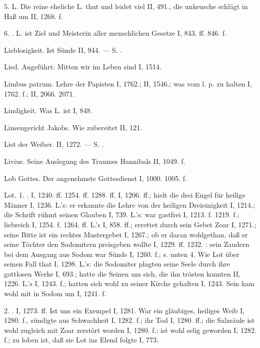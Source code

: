 5.  L. Die reine eheliche L. thut und leidet viel II, 491., die unkeusche schlägt in Haß um II, 1268. f.

6. . L. ist Ziel und Meisterin aller menschlichen Gesetze I, 843. ff. 846. f.

Lieblosigkeit. Ist Sünde II, 944. — S. .

Lied. Angeführt: Mitten wir im Leben sind I, 1514.

Limbus patrum. Lehre der Papisten I, 1762.; II, 1546.; was vom l. p. zu halten I, 1762. f.; II, 2066. 2071.

Lindigkeit. Was L. ist I, 848.

Linsengericht Jakobs. Wie zubereitet II, 121.

List der Weiber. II, 1272. — S. .

Livius. Seine Auslegung des Traumes Hannibals II, 1049. f.

Lob Gottes. Der angenehmste Gottesdienst I, 1000. 1005. f.

Lot. 1. . I, 1240. ff. 1254. ff. 1288. ff.  I, 1206. ff.; hielt die drei Engel für heilige Männer I, 1236.  L.’s: er erkannte die Lehre von der heiligen Dreieinigkeit I, 1214.; die Schrift rühmt seinen Glauben I, 739.  L.’s: war gastfrei I, 1213. f. 1219. f.; liebreich I, 1254. f. 1264. ff.  L.’s I, 858. ff.; errettet durch sein Gebet Zoar I, 1271.; seine Bitte ist ein rechtes Mustergebet I, 1267.; ob er daran wohlgethan, daß er seine Töchter den Sodomitern preisgeben wollte I, 1229. ff. 1232. : sein Zaudern bei dem Ausgang aus Sodom war Sünde I, 1260. f.; s. unten 4. Wie Lot über seinen Fall  that I, 1298.  L.’s: die Sodomiter plagten seine Seele durch ihre gottlosen Werke I, 693.; hatte die Seinen um sich, die ihn trösten konnten II, 1226.  L.’s I, 1243. f.; hatten
sich wohl zu seiner Kirche gehalten I, 1243. Sein  kam wohl mit in Sodom um I, 1241. f.

2. . I, 1273. ff. Ist uns ein Exempel I, 1281. War ein gläubiges, heiliges Weib I, 1280. f., sündigte aus Schwachheit I, 1282. f.; ihr Tod I, 1280. ff.; die Salzsäule ist wohl zugleich mit Zoar zerstört worden I, 1280. f.; ist wohl selig geworden I, 1282. f.; zu loben ist, daß sie Lot ins Elend folgte I, 773.

